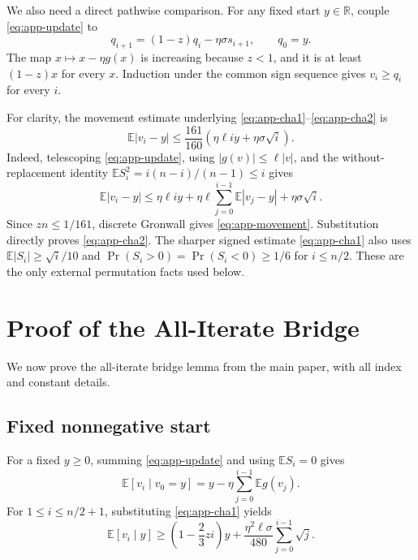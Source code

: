 \documentclass[twoside]{article}
\newcommand{\E}{\mathbb E}
\newcommand{\R}{\mathbb R}
\begin{document}
We also need a direct pathwise comparison. For any fixed start $y\in\R$,
couple \eqref{eq:app-update} to
\begin{equation}
 q_{i+1}=(1-z)q_i-\eta\sigma s_{i+1},\qquad q_0=y.
 \label{eq:app-symmetric}
\end{equation}
The map $x\mapsto x-\eta g(x)$ is increasing because $z<1$, and it is at
least $(1-z)x$ for every $x$. Induction under the common sign sequence gives
$v_i\ge q_i$ for every $i$.

For clarity, the movement estimate underlying
\eqref{eq:app-cha1}--\eqref{eq:app-cha2} is
\begin{equation}
 \E|v_i-y|\le\frac{161}{160}
 \left(\eta\ell i y+\eta\sigma\sqrt i\right).
 \label{eq:app-movement}
\end{equation}
Indeed, telescoping \eqref{eq:app-update}, using
$|g(v)|\le\ell|v|$, and the without-replacement identity
$\E S_i^2=i(n-i)/(n-1)\le i$ gives
\[
 \E|v_i-y|
 \le\eta\ell i y+\eta\ell\sum_{j=0}^{i-1}\E|v_j-y|
 +\eta\sigma\sqrt i.
\]
Since $zn\le1/161$, discrete Gronwall gives
\eqref{eq:app-movement}. Substitution directly proves
\eqref{eq:app-cha2}. The sharper signed estimate
\eqref{eq:app-cha1} also uses
$\E|S_i|\ge\sqrt i/10$ and
$\Pr(S_i>0)=\Pr(S_i<0)\ge1/6$ for $i\le n/2$.
These are the only external permutation facts used below.

\section{Proof of the All-Iterate Bridge}
\label{app:bridge}

We now prove the all-iterate bridge lemma from the main paper, with all index
and constant details.

\subsection{Fixed nonnegative start}

For a fixed $y\ge0$, summing \eqref{eq:app-update} and using
$\E S_i=0$ gives
\begin{equation}
 \E[v_i\mid v_0=y]=y-\eta\sum_{j=0}^{i-1}\E g(v_j).
 \label{eq:app-telescope}
\end{equation}
For $1\le i\le n/2+1$, substituting \eqref{eq:app-cha1} yields
\begin{equation}
 \E[v_i\mid y]
 \ge\left(1-\frac23zi\right)y
 +\frac{\eta^2\ell\sigma}{480}
 \sum_{j=0}^{i-1}\sqrt j.
 \label{eq:app-first}
\end{equation}
\end{document}
